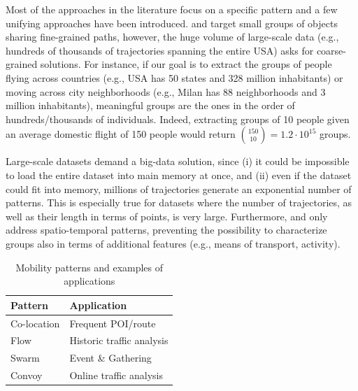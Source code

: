 \documentclass[preprint,12pt,authoryear]{elsarticle} %
\begin{document}
Most of the approaches in the literature focus on a specific pattern and a few unifying approaches have been introduced.
\cite{DBLP:journals/ijitdm/PhanPT16} and \cite{DBLP:journals/pvldb/FanZWT16} target small groups of objects sharing fine-grained paths, however, the huge volume of large-scale data (e.g., hundreds of thousands of trajectories spanning the entire USA) asks for coarse-grained solutions.
For instance, if our goal is to extract the groups of people flying across countries (e.g., USA has 50 states and 328 million inhabitants) or moving across city neighborhoods (e.g., Milan has 88 neighborhoods and 3 million inhabitants), meaningful groups are the ones in the order of hundreds/thousands of individuals. 
Indeed, extracting groups of 10 people given an average domestic flight of 150 people would return $\binom{150}{10} = 1.2 \cdot 10^{15}$ groups.

Large-scale datasets demand a big-data solution, since (i) it could be impossible to load the entire dataset into main memory at once, and (ii) even if the dataset could fit into memory, millions of trajectories generate an exponential number of patterns.
This is especially true for datasets where the number of trajectories, as well as their length in terms of points, is very large.
Furthermore, \cite{DBLP:journals/ijitdm/PhanPT16} and \cite{DBLP:journals/pvldb/FanZWT16} only address spatio-temporal patterns, preventing the possibility to characterize groups also in terms of additional features (e.g., means of transport, activity).

\begin{table}[t]
\centering
\scriptsize
\caption{Mobility patterns and examples of applications}

\label{tab:proximitypattern}
\begin{tabular}{ll}
\toprule
Pattern                                           & Application \\
\midrule
Co-location \citep{bao2021mining} & Frequent POI/route    \\
Flow \citep{DBLP:journals/tmc/HanLO15}             & Historic traffic analysis\\
Swarm \citep{DBLP:journals/pvldb/LiDHK10}          & Event \& Gathering\\ %
Convoy \citep{DBLP:journals/pvldb/JeungYZJS08}         & Online traffic analysis\\%
\bottomrule
\end{tabular}%
\end{table}
\end{document}
